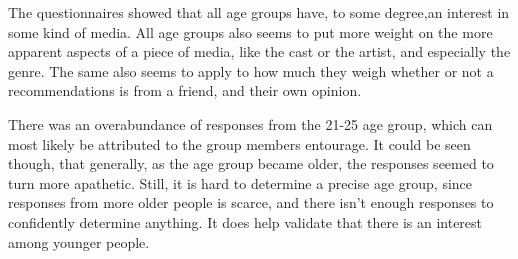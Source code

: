 The questionnaires showed that all age groups have, to some degree,an interest in some kind of media. All age groups also seems to put more weight on the more apparent aspects of a piece of media, like the cast or the artist, and especially the genre. The same also seems to apply to how much they weigh whether or not a recommendations is from a friend, and their own opinion.

There was an overabundance of responses from the 21-25 age group, which can most likely be attributed to the group members entourage. It could be seen though, that generally, as the age group became older, the responses seemed to turn more apathetic. Still, it is hard to determine a precise age group, since responses from more older people is scarce, and there isn’t enough responses to confidently determine anything. It does help validate that there is an interest among younger people. 
